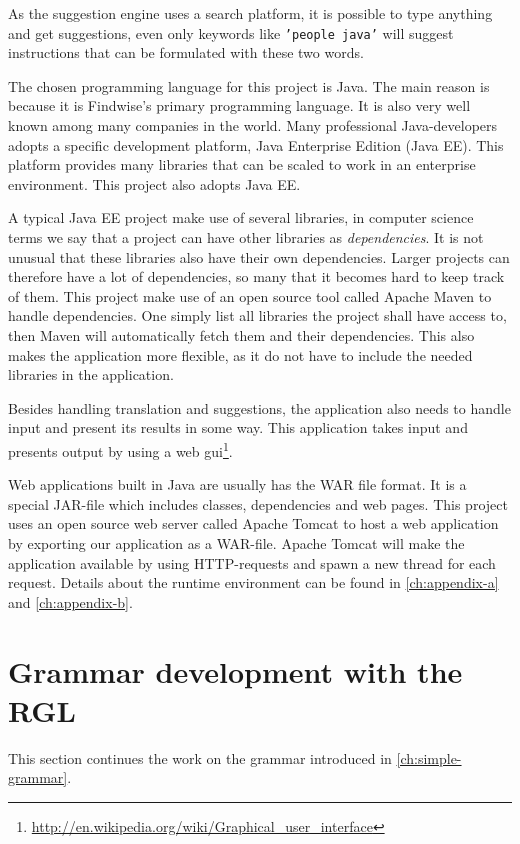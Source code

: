 As the suggestion engine uses a search platform, it is possible to type anything and get suggestions, even only keywords like \texttt{'people java'} will suggest instructions that can be formulated with these two words.

The chosen programming language for this project is Java. The main reason is because it is Findwise's primary programming language. It is also very well known among many companies in the world.
Many professional Java-developers adopts a specific development platform, Java Enterprise Edition (Java EE). This platform provides many libraries that can be scaled to work in an enterprise environment. This project also adopts Java EE.

A typical Java EE project make use of several libraries, in computer science terms we say that a project can have other libraries as \emph{dependencies}. It is not unusual that these libraries also have their own dependencies. Larger projects can therefore have a lot of dependencies, so many that it becomes hard to keep track of them. This project make use of an open source tool called Apache Maven to handle dependencies. One simply list all libraries the project shall have access to, then Maven will automatically fetch them and their dependencies. This also makes the application more flexible, as it do not have to include the needed libraries in the application.

Besides handling translation and suggestions, the application also needs to handle input and present its results in some way. This application takes input and presents output by using a web gui\footnote{\url{http://en.wikipedia.org/wiki/Graphical_user_interface}}.

Web applications built in Java are usually has the WAR file format. It is a special JAR-file which includes classes, dependencies and web pages. This project uses an open source web server called Apache Tomcat to host a web application by exporting our application as a WAR-file. Apache Tomcat will make the application available by using HTTP-requests and spawn a new thread for each request.
\newline
\newline
Details about the runtime environment can be found in \autoref{ch:appendix-a} and \autoref{ch:appendix-b}.

\section{Grammar development with the RGL}
This section continues the work on the grammar introduced in \autoref{ch:simple-grammar}.

